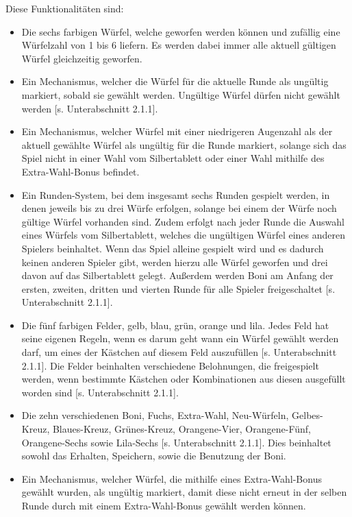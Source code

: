 Diese Funktionalitäten sind:
\begin{itemize}
\item Die sechs farbigen Würfel, welche geworfen werden können und zufällig eine Würfelzahl von 1 bis 6 liefern. Es werden dabei immer alle aktuell gültigen Würfel gleichzeitig geworfen.

\item Ein Mechanismus, welcher die Würfel für die aktuelle Runde als ungültig markiert, sobald sie gewählt werden. Ungültige Würfel dürfen nicht gewählt werden [s. Unterabschnitt 2.1.1].

\item Ein Mechanismus, welcher Würfel mit einer niedrigeren Augenzahl als der aktuell gewählte Würfel als ungültig für die Runde markiert, solange sich das Spiel nicht in einer Wahl vom Silbertablett oder einer Wahl mithilfe des Extra-Wahl-Bonus befindet.

\item Ein Runden-System, bei dem insgesamt sechs Runden gespielt werden, in denen jeweils bis zu drei Würfe erfolgen, solange bei einem der Würfe noch gültige Würfel vorhanden sind. Zudem erfolgt nach jeder Runde die Auswahl eines Würfels vom Silbertablett, welches die ungültigen Würfel eines anderen Spielers beinhaltet. Wenn das Spiel alleine gespielt wird und es dadurch keinen anderen Spieler gibt, werden hierzu alle Würfel geworfen und drei davon auf das Silbertablett gelegt. Außerdem werden Boni am Anfang der ersten, zweiten, dritten und vierten Runde für alle Spieler freigeschaltet [s. Unterabschnitt 2.1.1].

\item Die fünf farbigen Felder, gelb, blau, grün, orange und lila. Jedes Feld hat seine eigenen Regeln, wenn es darum geht wann ein Würfel gewählt werden darf, um eines der Kästchen auf diesem Feld auszufüllen [s. Unterabschnitt 2.1.1]. Die Felder beinhalten verschiedene Belohnungen, die freigespielt werden, wenn bestimmte Kästchen oder Kombinationen aus diesen ausgefüllt worden sind [s. Unterabschnitt 2.1.1].

\item Die zehn verschiedenen Boni, Fuchs, Extra-Wahl, Neu-Würfeln, Gelbes-Kreuz, Blaues-Kreuz, Grünes-Kreuz, Orangene-Vier, Orangene-Fünf, Orangene-Sechs sowie Lila-Sechs [s. Unterabschnitt 2.1.1]. Dies beinhaltet sowohl das Erhalten, Speichern, sowie die Benutzung der Boni.

\item Ein Mechanismus, welcher Würfel, die mithilfe eines Extra-Wahl-Bonus gewählt wurden, als ungültig markiert, damit diese nicht erneut in der selben Runde durch mit einem Extra-Wahl-Bonus gewählt werden können.


\end{itemize}
